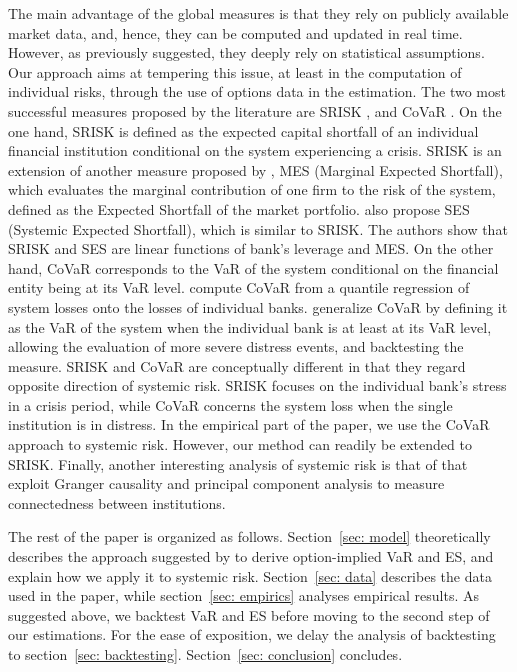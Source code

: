 \documentclass[11pt,a4paper,english]{article}
\begin{document}
The main advantage of the global measures is that they rely on publicly available market data, and, hence, they can be computed and updated in real time. However, as previously suggested, they deeply rely on statistical assumptions. Our approach aims at tempering this issue, at least in the computation of individual risks, through the use of options data in the estimation. The two most successful measures proposed by the literature are SRISK \citep{Acharya2012, Brownless2016}, and CoVaR \citep{Adrian2016}. On the one hand, SRISK is defined as the expected capital shortfall of an individual financial institution conditional on the system experiencing a crisis. SRISK is an extension of another measure proposed by \citet{Acharya2017}, MES (Marginal Expected Shortfall), which evaluates the marginal contribution of one firm to the risk of the system, defined as the Expected Shortfall of the market portfolio. \citet{Acharya2017} also propose SES (Systemic Expected Shortfall), which is similar to SRISK. The authors show that SRISK and SES are linear functions of bank's leverage and MES. On the other hand, CoVaR corresponds to the VaR of the system conditional on the financial entity being at its VaR level. \citet{Adrian2016} compute CoVaR from a quantile regression of system losses onto the losses of individual banks. \citet{Girardi2013} generalize CoVaR by defining it as the VaR of the system when the individual bank is at least at its VaR level, allowing the evaluation of more severe distress events, and backtesting the measure. SRISK and CoVaR are conceptually different in that they regard opposite direction of systemic risk. SRISK focuses on the individual bank's stress in a crisis period, while CoVaR concerns the system loss when the single institution is in distress. In the empirical part of the paper, we use the CoVaR approach to systemic risk. However, our method can readily be extended to SRISK. Finally, another interesting analysis of systemic risk is that of \citet{Billio2012} that exploit Granger causality and principal component analysis to measure connectedness between institutions.

The rest of the paper is organized as follows. Section~\ref{sec: model} theoretically describes the approach suggested by \citet{GBA16} to derive option-implied VaR and ES, and explain how we apply it to systemic risk. Section~\ref{sec: data} describes the data used in the paper, while section~\ref{sec: empirics} analyses empirical results. As suggested above, we backtest VaR and ES before moving to the second step of our estimations. For the ease of exposition, we delay the analysis of backtesting to section~\ref{sec: backtesting}. Section~\ref{sec: conclusion} concludes.
\end{document}
